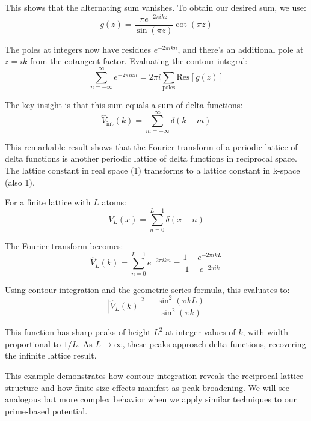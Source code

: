 \documentclass[11pt, oneside]{article}
\begin{document}
This shows that the alternating sum vanishes. To obtain our desired sum, we use:
\begin{equation}
g(z) = \frac{\pi e^{-2\pi i k z}}{\sin(\pi z)} \cot(\pi z)
\end{equation}

The poles at integers now have residues $e^{-2\pi i k n}$, and there's an additional pole at $z = ik$ from the cotangent factor. Evaluating the contour integral:
\begin{equation}
\sum_{n=-\infty}^{\infty} e^{-2\pi i k n} = 2\pi i \sum_{\text{poles}} \text{Res}[g(z)]
\end{equation}

The key insight is that this sum equals a sum of delta functions:
\begin{equation}
\hat{V}_{\text{int}}(k) = \sum_{m=-\infty}^{\infty} \delta(k - m)
\end{equation}

This remarkable result shows that the Fourier transform of a periodic lattice of delta functions is another periodic lattice of delta functions in reciprocal space. The lattice constant in real space (1) transforms to a lattice constant in k-space (also 1).

For a finite lattice with $L$ atoms:
\begin{equation}
V_{L}(x) = \sum_{n=0}^{L-1} \delta(x - n)
\end{equation}

The Fourier transform becomes:
\begin{equation}
\hat{V}_{L}(k) = \sum_{n=0}^{L-1} e^{-2\pi i k n} = \frac{1 - e^{-2\pi i k L}}{1 - e^{-2\pi i k}}
\end{equation}

Using contour integration and the geometric series formula, this evaluates to:
\begin{equation}
|\hat{V}_{L}(k)|^2 = \frac{\sin^2(\pi k L)}{\sin^2(\pi k)}
\end{equation}

This function has sharp peaks of height $L^2$ at integer values of $k$, with width proportional to $1/L$. As $L \to \infty$, these peaks approach delta functions, recovering the infinite lattice result.

This example demonstrates how contour integration reveals the reciprocal lattice structure and how finite-size effects manifest as peak broadening. We will see analogous but more complex behavior when we apply similar techniques to our prime-based potential.
\end{document}
